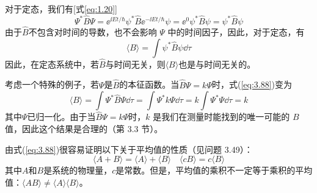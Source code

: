 	对于定态，我们有[式\ref{eq:1.20}]
	\begin{equation*}
		\Psi^{\ast}\hat{B}\Psi = \ee ^{\ii Et/\hbar}\psi^{\ast}\hat{B}\ee ^{-\ii Et/\hbar}\psi = \ee ^{0}\psi^{\ast}\hat{B}\psi = \psi^{\ast}\hat{B}\psi
	\end{equation*}
	由于$\hat{B}$不包含对时间的导数，也不会影响 $\Psi$ 中的时间因子，因此，对于定态，有
	\begin{equation}
		\langle B \rangle = \int \psi^{\ast}\hat{B}\psi\dd \tau
		\label{eq:3.89}
	\end{equation}
	因此，在定态系统中，若$\hat{B}$与时间无关，则$\langle B \rangle$也是与时间无关的。

	考虑一个特殊的例子，若$\Psi$是$\hat{B}$的本征函数。当$\hat{B}\Psi = k\Psi$时，式(\ref{eq:3.88})变为
	\begin{equation*}
		\langle B \rangle = \int \Psi^{\ast}\hat{B}\Psi\dd \tau = \int \Psi^{\ast}k\Psi\dd \tau = k \int \Psi^{\ast}\Psi\dd \tau = k
	\end{equation*}
	其中$\Psi$已归一化。由于当$\hat{B}\Psi = k\Psi$时，$k$ 是我们在测量时能找到的唯一可能的 $B$ 值，因此这个结果是合理的（第 3.3 节）。

	由式(\ref{eq:3.88})很容易证明以下关于平均值的性质（见问题 3.49）：
	\begin{equation}
		\boxed{
			\langle A + B \rangle = \langle A \rangle + \langle B \rangle
		}
		\quad
		\boxed{
			\langle cB \rangle = c\langle B \rangle
		}
		\label{eq:3.90}
	\end{equation}
	其中$A$和$B$是系统的物理量，$c$是常数。但是，平均值的乘积不一定等于乘积的平均值：$\langle AB \rangle \neq \langle A \rangle\langle B \rangle$。

